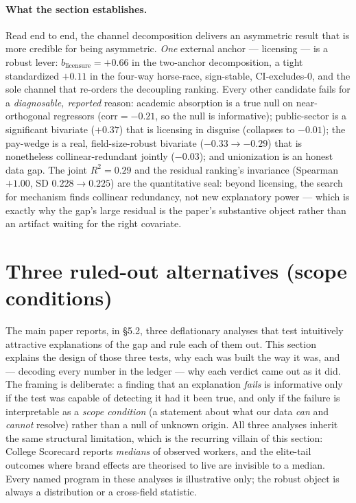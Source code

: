 \documentclass[11pt]{article}
\begin{document}
\paragraph{What the section establishes.} Read end to end, the channel decomposition delivers an asymmetric result that is more credible for being asymmetric. \emph{One} external anchor --- licensing --- is a robust lever: $b_{\text{licensure}}=+0.66$ in the two-anchor decomposition, a tight standardized $+0.11$ in the four-way horse-race, sign-stable, CI-excludes-0, and the sole channel that re-orders the decoupling ranking. Every other candidate fails for a \emph{diagnosable, reported} reason: academic absorption is a true null on near-orthogonal regressors ($\mathrm{corr}=-0.21$, so the null is informative); public-sector is a significant bivariate ($+0.37$) that is licensing in disguise (collapses to $-0.01$); the pay-wedge is a real, field-size-robust bivariate ($-0.33\to-0.29$) that is nonetheless collinear-redundant jointly ($-0.03$); and unionization is an honest data gap. The joint $R^2=0.29$ and the residual ranking's invariance (Spearman $+1.00$, SD $0.228\to0.225$) are the quantitative seal: beyond licensing, the search for mechanism finds collinear redundancy, not new explanatory power --- which is exactly why the gap's large residual is the paper's substantive object rather than an artifact waiting for the right covariate.\section{Three ruled-out alternatives (scope conditions)}\label{sec:companion-ruleout}

The main paper reports, in \S5.2, three deflationary analyses that test intuitively attractive explanations of the gap and rule each of them out. This section explains the design of those three tests, why each was built the way it was, and --- decoding every number in the ledger --- why each verdict came out as it did. The framing is deliberate: a finding that an explanation \emph{fails} is informative only if the test was capable of detecting it had it been true, and only if the failure is interpretable as a \emph{scope condition} (a statement about what our data \emph{can} and \emph{cannot} resolve) rather than a null of unknown origin. All three analyses inherit the same structural limitation, which is the recurring villain of this section: College Scorecard reports \emph{medians} of observed workers, and the elite-tail outcomes where brand effects are theorised to live \citep{chetty2023diversifying} are invisible to a median. Every named program in these analyses is illustrative only; the robust object is always a distribution or a cross-field statistic.
\end{document}

